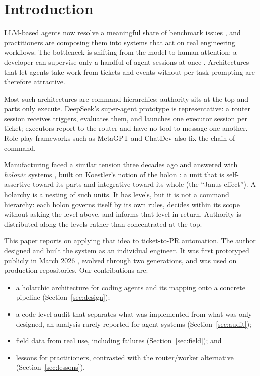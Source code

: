 \documentclass[conference]{IEEEtran}
\begin{document}
\section{Introduction}

LLM-based agents now resolve a meaningful share of benchmark issues
\cite{jimenez2024swebench,yang2024sweagent,wang2025openhands,xia2024agentless},
and practitioners are composing them into systems that act on real
engineering workflows. The bottleneck is shifting from the model to
human attention: a developer can supervise only a handful of agent sessions
at once \cite{deepseek2026superagent}. Architectures that let agents take
work from tickets and events without per-task prompting are therefore
attractive.

Most such architectures are command hierarchies: authority sits at the top
and parts only execute. DeepSeek's super-agent prototype
\cite{deepseek2026superagent} is representative: a router session receives
triggers, evaluates them, and launches one executor session per ticket;
executors report to the router and have no tool to message one another.
Role-play frameworks such as MetaGPT \cite{hong2024metagpt} and ChatDev
\cite{qian2024chatdev} also fix the chain of command.

Manufacturing faced a similar tension three decades ago and answered with
\emph{holonic} systems \cite{vanbrussel1998prosa,gerber1999holonic,giret2004holons},
built on Koestler's notion of the holon \cite{koestler1967}: a unit that is
self-assertive toward its parts and integrative toward its whole (the
``Janus effect''). A holarchy is a nesting of such units. It has levels,
but it is not a command hierarchy: each holon governs itself by its own
rules, decides within its scope without asking the level above, and
informs that level in return. Authority is distributed along the levels
rather than concentrated at the top.

This paper reports on applying that idea to ticket-to-PR automation.
The author designed and built the system as an individual engineer.
It was first prototyped publicly in March 2026
\cite{coelho2026book,coelho2026prototypes}, evolved through two generations,
and was used on production repositories. Our contributions are:
\begin{itemize}
  \item a holarchic architecture for coding agents and its mapping onto a
        concrete pipeline (Section~\ref{sec:design});
  \item a code-level audit that separates what was implemented from what was
        only designed, an analysis rarely reported for agent systems
        (Section~\ref{sec:audit});
  \item field data from real use, including failures
        (Section~\ref{sec:field}); and
  \item lessons for practitioners, contrasted with the router/worker
        alternative (Section~\ref{sec:lessons}).
\end{itemize}
\end{document}
